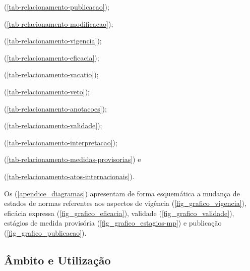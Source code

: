 \documentclass[a4paper,11pt,openright,twoside,brazil]{abntex2}
\begin{document}
\begin{alineas}
 \item {}
 (\autoref{tab-relacionamento-publicacao});

 \item {}
 (\autoref{tab-relacionamento-modificacao});

 \item {}
 (\autoref{tab-relacionamento-vigencia});

 \item {}
 (\autoref{tab-relacionamento-eficacia});

 \item {}
 (\autoref{tab-relacionamento-vacatio});

 \item {} (\autoref{tab-relacionamento-veto});

 \item {}
 (\autoref{tab-relacionamento-anotacoes});

 \item {}
 (\autoref{tab-relacionamento-validade});

 \item {}
 (\autoref{tab-relacionamento-interpretacao});

 \item {}
 (\autoref{tab-relacionamento-medidas-provisorias}) e

 \item {}
 (\autoref{tab-relacionamento-atos-internacionais}).
  
\end{alineas}

Os  (\autoref{apendice_diagramas}) apresentam de
forma esquemática a mudança de estados de normas referentes aos aspectos de
vigência (\autoref{fig_grafico_vigencia}), eficácia expressa
(\autoref{fig_grafico_eficacia}), validade (\autoref{fig_grafico_validade}),
estágios de medida provisória (\autoref{fig_grafico_estagios-mp}) e publicação
(\autoref{fig_grafico_publicacao}).

\subsection{Âmbito e Utilização}
\end{document}
